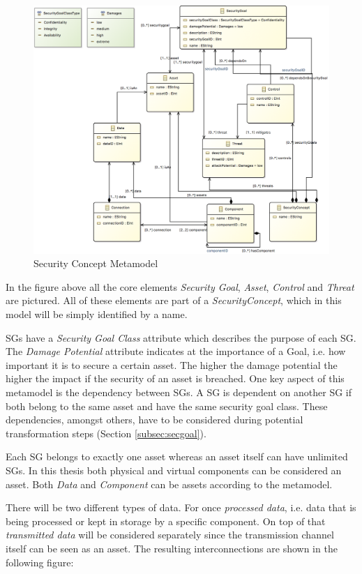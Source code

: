 \begin{figure}[H]
\centering
\includegraphics[width=\textwidth]{pictures/concept_metamodel.png}
\caption{Security Concept Metamodel}
\label{fig:concept_metamodel}
\end{figure}

In the figure above all the core elements \textit{Security Goal}, \textit{Asset}, \textit{Control} and \textit{Threat} are pictured. All of these elements are part of a \textit{SecurityConcept}, which in this model will be simply identified by a name. 

SGs have a \textit{Security Goal Class} attribute which describes the purpose of each SG. The \textit{Damage Potential} attribute indicates at the importance of a Goal, i.e. how important it is to secure a certain asset. The higher the damage potential the higher the impact if the security of an asset is breached. One key aspect of this metamodel is the dependency between SGs. A SG is dependent on another SG if both belong to the same asset and have the same security goal class. These dependencies, amongst others, have to be considered during potential transformation steps (Section \ref{subsec:secgoal}). 

Each SG belongs to exactly one asset whereas an asset itself can have unlimited SGs. In this thesis both physical and virtual components can be considered an asset. Both \textit{Data} and \textit{Component} can be assets according to the metamodel. 

There will be two different types of data. For once \textit{processed data}, i.e. data that is being processed or kept in storage by a specific component. On top of that \textit{transmitted data} will be considered separately since the transmission channel itself can be seen as an asset. The resulting interconnections are shown in the following figure:

